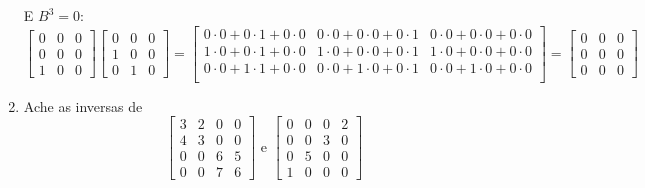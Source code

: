 \documentclass[leqno]{article}
\begin{document}
\begin{enumerate}
\begin{sol}
		E $B^3 = 0$:\\
		$$\begin{bmatrix}
			0 & 0 & 0\\
			0 & 0 & 0\\
			1 & 0 & 0
		\end{bmatrix}
		\begin{bmatrix}
			0 & 0 & 0\\
			1 & 0 & 0\\
			0 & 1 & 0
		\end{bmatrix} =
		\begin{bmatrix}
			0 \cdot 0 + 0 \cdot 1 + 0 \cdot 0 & 0 \cdot 0 + 0 \cdot 0 + 0 \cdot 1 & 0 \cdot 0 + 0 \cdot 0 + 0 \cdot 0\\
			1 \cdot 0 + 0 \cdot 1 + 0 \cdot 0 & 1 \cdot 0 + 0 \cdot 0 + 0 \cdot 1 & 1 \cdot 0 + 0 \cdot 0 + 0 \cdot 0\\
			0 \cdot 0 + 1 \cdot 1 + 0 \cdot 0 & 0 \cdot 0 + 1 \cdot 0 + 0 \cdot 1 & 0 \cdot 0 + 1 \cdot 0 + 0 \cdot 0\\
		\end{bmatrix} = 
		\begin{bmatrix}
			0 & 0 & 0\\
			0 & 0 & 0\\
			0 & 0 & 0
		\end{bmatrix} $$
		\end{sol} 
		\newline
		\item Ache as inversas de 
		$$\begin{bmatrix} 
			3 & 2 & 0 & 0 \\
			4 & 3 & 0 & 0 \\
			0 & 0 & 6 & 5 \\
			0 & 0 & 7 & 6
		\end{bmatrix} \mbox{ e } 
		\begin{bmatrix} 
			0 & 0 & 0 & 2 \\
			0 & 0 & 3 & 0 \\
			0 & 5 & 0 & 0 \\
			1 & 0 & 0 & 0
		\end{bmatrix}$$
		

\end{enumerate}
\end{document}
